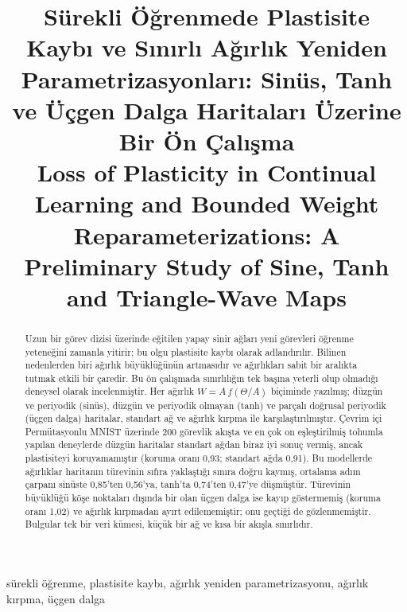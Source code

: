 \documentclass[conference,a4paper]{IEEEtran}
\begin{document}
\title{Sürekli Öğrenmede Plastisite Kaybı ve Sınırlı Ağırlık Yeniden Parametrizasyonları:
Sinüs, Tanh ve Üçgen Dalga Haritaları Üzerine Bir Ön Çalışma\\[4pt]
{\large Loss of Plasticity in Continual Learning and Bounded Weight Reparameterizations:
A Preliminary Study of Sine, Tanh and Triangle-Wave Maps}}

\author{}

\maketitle

\begin{abstract}
Uzun bir görev dizisi üzerinde eğitilen yapay sinir ağları yeni görevleri öğrenme yeteneğini zamanla yitirir;
bu olgu plastisite kaybı olarak adlandırılır. Bilinen nedenlerden biri ağırlık büyüklüğünün artmasıdır ve
ağırlıkları sabit bir aralıkta tutmak etkili bir çaredir. Bu ön çalışmada sınırlılığın tek başına yeterli olup
olmadığı deneysel olarak incelenmiştir. Her ağırlık $W=A\,f(\Theta/A)$ biçiminde yazılmış; düzgün ve periyodik
(sinüs), düzgün ve periyodik olmayan (tanh) ve parçalı doğrusal periyodik (üçgen dalga) haritalar, standart ağ ve
ağırlık kırpma ile karşılaştırılmıştır. Çevrim içi Permütasyonlu MNIST üzerinde 200 görevlik akışta ve en çok on
eşleştirilmiş tohumla yapılan deneylerde düzgün haritalar standart ağdan biraz iyi sonuç vermiş, ancak
plastisiteyi koruyamamıştır (koruma oranı 0,93; standart ağda 0,91). Bu modellerde ağırlıklar haritanın
türevinin sıfıra yaklaştığı sınıra doğru kaymış, ortalama adım çarpanı sinüste 0,85'ten 0,56'ya, tanh'ta
0,74'ten 0,47'ye düşmüştür. Türevinin büyüklüğü köşe noktaları dışında bir olan üçgen dalga ise kayıp
göstermemiş (koruma oranı 1,02) ve ağırlık kırpmadan ayırt edilememiştir; onu geçtiği de gözlenmemiştir.
Bulgular tek bir veri kümesi, küçük bir ağ ve kısa bir akışla sınırlıdır.
\end{abstract}

\begin{IEEEkeywords}
sürekli öğrenme, plastisite kaybı, ağırlık yeniden parametrizasyonu, ağırlık kırpma, üçgen dalga
\end{IEEEkeywords}
\end{document}
